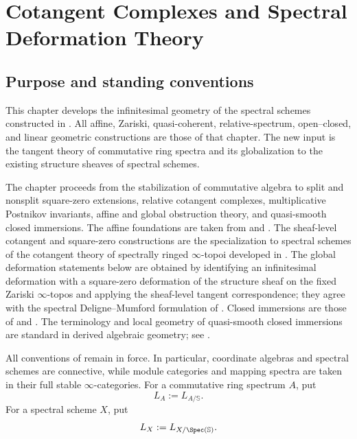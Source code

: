 \chapter{Cotangent Complexes and Spectral Deformation Theory}
\label{chap:spectral-deformation-theory}

\section{Purpose and standing conventions}
\label{sec:spectral-deformation-purpose}

This chapter develops the infinitesimal geometry of the spectral schemes
constructed in . All affine,
Zariski, quasi-coherent, relative-spectrum, open--closed, and linear
geometric constructions are those of that chapter. The new input is the
tangent theory of commutative ring spectra and its globalization to the
existing structure sheaves of spectral schemes.

The chapter proceeds from the stabilization of commutative algebra to
split and nonsplit square-zero extensions, relative cotangent complexes,
multiplicative Postnikov invariants, affine and global obstruction theory,
and quasi-smooth closed immersions. The affine foundations are taken from
\cite[Sections~7.3--7.4]{LurieHigherAlgebra} and
\cite[Sections~1--3]{LurieDAGIV}. The sheaf-level cotangent and
square-zero constructions are the specialization to spectral schemes of
the cotangent theory of spectrally ringed $\infty$-topoi developed in
\cite[Chapter~17]{LurieSAG}. The global deformation statements below are
obtained by identifying an infinitesimal deformation with a square-zero
deformation of the structure sheaf on the fixed Zariski $\infty$-topos
and applying the sheaf-level tangent correspondence; they agree with the
spectral Deligne--Mumford formulation of
\cite[Section~19.4.3]{LurieSAG}. Closed immersions are those of
 and
\cite{LurieDAGIX}. The terminology and local geometry of quasi-smooth
closed immersions are standard in derived algebraic geometry; see
\cite[Section~2.1.2]{KhanQuasiSmoothBlowups}.

All conventions of  remain in
force. In particular, coordinate algebras and spectral schemes are
connective, while module categories and mapping spectra are taken in their
full stable \(\infty\)-categories. For a commutative ring spectrum \(A\),
put
\[
    L_A
    :=
    L_{A/\mathbb S}.
\]
For a spectral scheme \(X\), put
\[
    L_X
    :=
    L_{X/\Spec(\mathbb S)}.
\]

